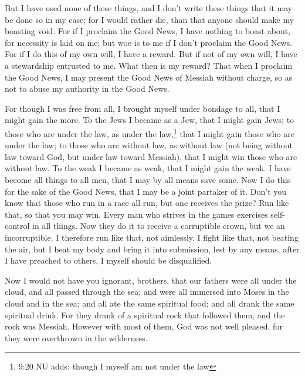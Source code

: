 \myverse{}But I have used none of these things, and I don’t write these
things that it may be done so in my case; for I would rather die, than that anyone should make my boasting
void.
\myverse{}For if I proclaim the Good News, I have nothing to boast about, for necessity
is laid on me; but woe is to me if I don’t proclaim the Good News.
\myverse{}For if I do this of my own will, I have a reward. But if not of my own will,
I have a stewardship entrusted to me.
\myverse{}What then is my reward? That when I proclaim the Good News, I may present
the Good News of Messiah without charge, so as not to abuse my authority in the Good News.

\myverse{}For though I was free from all, I brought myself under bondage
to all, that I might gain the more.
\myverse{}To the Jews I became as a Jew, that I might gain Jews; to those who are under
the law, as under the law,\footnote{9:20 NU adds: though I myself am not under the law} that I might gain those who are under
the law;
\myverse{}to those who are without law, as without law (not being without law toward
God, but under law toward Messiah), that I might win those who are without law.
\myverse{}To the weak I became as weak, that I might gain the weak. I have become all
things to all men, that I may by all means save some.
\myverse{}Now I do this for the sake of the Good News, that I may be a joint partaker
of it.
\myverse{}Don’t you know that those who run in a race all run, but one receives the
prize? Run like that, so that you may win.
\myverse{}Every man who strives in the games exercises self-control in all things. Now
they do it to receive a corruptible crown, but we an incorruptible.
\myverse{}I therefore run like that, not aimlessly. I fight like that, not beating the
air,
\myverse{}but I beat my body and bring it into submission, lest by any means, after
I have preached to others, I myself should be disqualified.


\mychapter{} \myverse*{}Now I would not have you ignorant, brothers, that our fathers
were all under the cloud, and all passed through the sea;
\myverse{}and were all immersed into Moses in the cloud and in the sea;
\myverse{}and all ate the same spiritual food;
\myverse{}and all drank the same spiritual drink. For they drank of a spiritual rock
that followed them, and the rock was Messiah.
\myverse{}However with most of them, God was not well pleased, for they were overthrown
in the wilderness.


